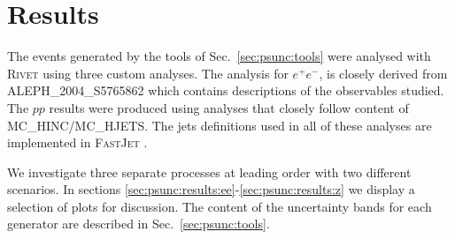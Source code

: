 \section{Results}
\label{sec:psunc:results}
The events generated by the tools of Sec.~\ref{sec:psunc:tools} were analysed with \textsc{Rivet} \cite{Buckley:2010ar} using three custom analyses. The analysis for $e^+e^-$, is closely derived from \textsc{ALEPH\_2004\_S5765862} \cite{Heister:2003aj} which contains descriptions of the observables studied. The $pp$ results were produced using analyses that closely follow content of \textsc{MC\_HINC}/\textsc{MC\_HJETS}. The jets definitions used in all of these analyses are implemented in \textsc{FastJet} \cite{Cacciari:2011ma}.

We investigate three separate processes at leading order with two different scenarios. In sections \ref{sec:psunc:results:ee}-\ref{sec:psunc:results:z} we display a selection of plots for discussion. The content of the uncertainty bands for each generator are described in Sec.~\ref{sec:psunc:tools}.

